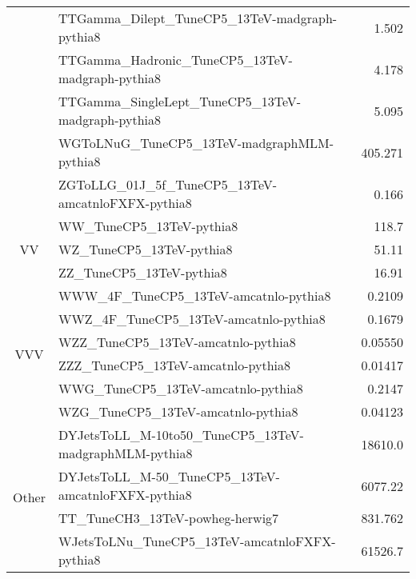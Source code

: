 \begin{table}
\begin{tabular}{ c l r }
                           & TTGamma\_Dilept\_TuneCP5\_13TeV-madgraph-pythia8          & 1.502              \\
                           & TTGamma\_Hadronic\_TuneCP5\_13TeV-madgraph-pythia8        & 4.178              \\
                           & TTGamma\_SingleLept\_TuneCP5\_13TeV-madgraph-pythia8      & 5.095              \\
                           & WGToLNuG\_TuneCP5\_13TeV-madgraphMLM-pythia8              & 405.271            \\
                           & ZGToLLG\_01J\_5f\_TuneCP5\_13TeV-amcatnloFXFX-pythia8     & 0.166              \\
    \hline
    \multirow{3}{*}{VV}    & WW\_TuneCP5\_13TeV-pythia8                                & 118.7              \\
                           & WZ\_TuneCP5\_13TeV-pythia8                                & 51.11              \\
                           & ZZ\_TuneCP5\_13TeV-pythia8                                & 16.91              \\
    \hline
    \multirow{6}{*}{VVV}   & WWW\_4F\_TuneCP5\_13TeV-amcatnlo-pythia8                  & 0.2109             \\
                           & WWZ\_4F\_TuneCP5\_13TeV-amcatnlo-pythia8                  & 0.1679             \\
                           & WZZ\_TuneCP5\_13TeV-amcatnlo-pythia8                      & 0.05550            \\
                           & ZZZ\_TuneCP5\_13TeV-amcatnlo-pythia8                      & 0.01417            \\
                           & WWG\_TuneCP5\_13TeV-amcatnlo-pythia8                      & 0.2147             \\
                           & WZG\_TuneCP5\_13TeV-amcatnlo-pythia8                      & 0.04123            \\
    \hline
    \multirow{4}{*}{Other} & DYJetsToLL\_M-10to50\_TuneCP5\_13TeV-madgraphMLM-pythia8  & 18610.0            \\
                           & DYJetsToLL\_M-50\_TuneCP5\_13TeV-amcatnloFXFX-pythia8     & 6077.22            \\
                           & TT\_TuneCH3\_13TeV-powheg-herwig7                         & 831.762            \\
                           & WJetsToLNu\_TuneCP5\_13TeV-amcatnloFXFX-pythia8           & 61526.7            \\
    \hline
  \end{tabular}
\end{table}


